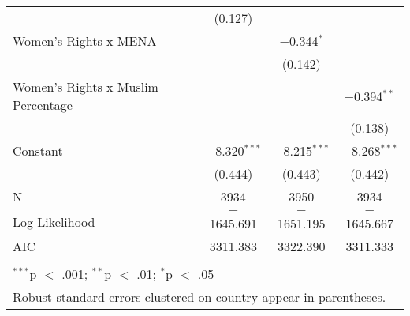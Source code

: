 \begin{table}[!htbp]
\begin{tabular}{@{\extracolsep{5pt}}lccc}
  & (0.127) &  &  \\ 
  Women's Rights x MENA &  & $-$0.344$^{*}$ &  \\ 
  &  & (0.142) &  \\ 
  Women's Rights x Muslim Percentage &  &  & $-$0.394$^{**}$ \\ 
  &  &  & (0.138) \\ 
  Constant & $-$8.320$^{***}$ & $-$8.215$^{***}$ & $-$8.268$^{***}$ \\ 
  & (0.444) & (0.443) & (0.442) \\ 
 N & 3934 & 3950 & 3934 \\ 
Log Likelihood & $-$1645.691 & $-$1651.195 & $-$1645.667 \\ 
AIC & 3311.383 & 3322.390 & 3311.333 \\ 
\hline \\[-1.8ex] 
\multicolumn{4}{l}{$^{***}$p $<$ .001; $^{**}$p $<$ .01; $^{*}$p $<$ .05} \\ 
\multicolumn{4}{l}{Robust standard errors clustered on country appear in parentheses.} \\ 
\end{tabular} 
\end{table} 
